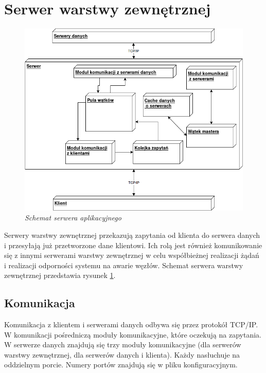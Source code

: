 \section{Serwer warstwy zewnętrznej}

\begin{figure}[!h]
    \begin{center}
    \includegraphics[angle=0,scale=0.5]{img/ext_serv.png}
    \end{center}
    \caption{\em Schemat serwera aplikacyjnego}
    \label{fig:serv}
\end{figure}

Serwery warstwy zewnętrznej przekazują zapytania od klienta do serwera danych i przesyłają już przetworzone dane klientowi. Ich rolą jest również komunikowanie się z innymi serwerami warstwy zewnętrznej w celu współbieżnej realizacji żądań i realizacji odporności systemu na awarie węzłów. Schemat serwera warstwy zewnętrznej przedstawia rysunek \ref{fig:serv}.

\subsection{Komunikacja}
Komunikacja z klientem i serwerami danych odbywa się przez protokół TCP/IP. W komunikacji pośredniczą moduły komunikacyjne, które oczekują na zapytania. W serwerze danych znajdują się trzy moduły komunikacyjne (dla serwerów warstwy zewnętrznej, dla serwerów danych i klienta). Każdy nasłuchuje na oddzielnym porcie. Numery portów znajdują się w pliku konfiguracyjnym. 

